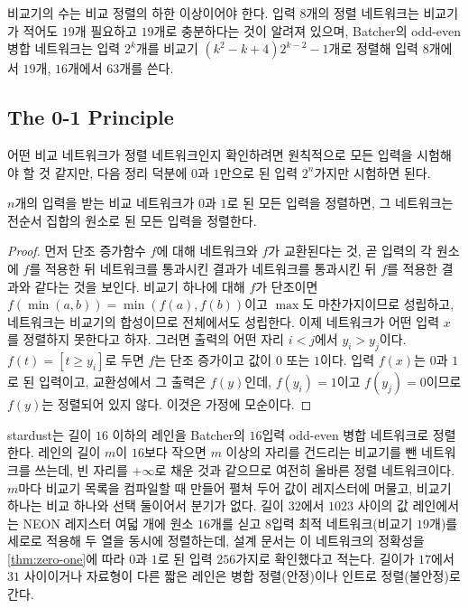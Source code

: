 비교기의 수는 비교 정렬의 하한 이상이어야 한다. 입력 $8$개의 정렬 네트워크는 비교기가 적어도 $19$개 필요하고 $19$개로 충분하다는 것이 알려져 있으며\cite{knuth1998taocp3}, Batcher의 odd-even 병합 네트워크는 입력 $2^k$개를 비교기 $(k^2-k+4)2^{k-2}-1$개로 정렬해 입력 $8$개에서 $19$개, $16$개에서 $63$개를 쓴다\cite{batcher1968}.

\subsection{The 0-1 Principle}

어떤 비교 네트워크가 정렬 네트워크인지 확인하려면 원칙적으로 모든 입력을 시험해야 할 것 같지만, 다음 정리 덕분에 $0$과 $1$만으로 된 입력 $2^n$가지만 시험하면 된다.

\begin{theorem}[0-1 원리]
\label{thm:zero-one}
$n$개의 입력을 받는 비교 네트워크가 $0$과 $1$로 된 모든 입력을 정렬하면, 그 네트워크는 전순서 집합의 원소로 된 모든 입력을 정렬한다.
\end{theorem}

\begin{proof}
먼저 단조 증가함수 $f$에 대해 네트워크와 $f$가 교환된다는 것, 곧 입력의 각 원소에 $f$를 적용한 뒤 네트워크를 통과시킨 결과가 네트워크를 통과시킨 뒤 $f$를 적용한 결과와 같다는 것을 보인다. 비교기 하나에 대해 $f$가 단조이면 $f(\min(a,b))=\min(f(a),f(b))$이고 $\max$도 마찬가지이므로 성립하고, 네트워크는 비교기의 합성이므로 전체에서도 성립한다. 이제 네트워크가 어떤 입력 $x$를 정렬하지 못한다고 하자. 그러면 출력의 어떤 자리 $i<j$에서 $y_i>y_j$이다. $f(t)=[t\ge y_i]$로 두면 $f$는 단조 증가이고 값이 $0$ 또는 $1$이다. 입력 $f(x)$는 $0$과 $1$로 된 입력이고, 교환성에서 그 출력은 $f(y)$인데, $f(y_i)=1$이고 $f(y_j)=0$이므로 $f(y)$는 정렬되어 있지 않다. 이것은 가정에 모순이다.
\end{proof}

\begin{instardust}
stardust는 길이 $16$ 이하의 레인을 Batcher의 $16$입력 odd-even 병합 네트워크로 정렬한다. 레인의 길이 $m$이 $16$보다 작으면 $m$ 이상의 자리를 건드리는 비교기를 뺀 네트워크를 쓰는데, 빈 자리를 $+\infty$로 채운 것과 같으므로 여전히 올바른 정렬 네트워크이다. $m$마다 비교기 목록을 컴파일할 때 만들어 펼쳐 두어 값이 레지스터에 머물고, 비교기 하나는 비교 하나와 선택 둘이어서 분기가 없다. 길이 $32$에서 $1023$ 사이의 값 레인에서는 NEON 레지스터 여덟 개에 원소 $16$개를 싣고 $8$입력 최적 네트워크(비교기 $19$개)를 세로로 적용해 두 열을 동시에 정렬하는데, 설계 문서는 이 네트워크의 정확성을 \cref{thm:zero-one}에 따라 $0$과 $1$로 된 입력 $256$가지로 확인했다고 적는다. 길이가 $17$에서 $31$ 사이이거나 자료형이 다른 짧은 레인은 병합 정렬(안정)이나 인트로 정렬(불안정)로 간다.
\end{instardust}

